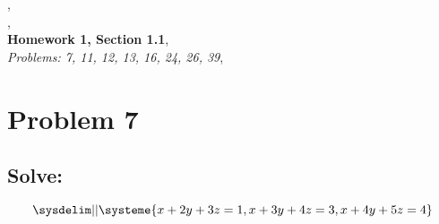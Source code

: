 \documentclass{article}
\begin{document}

\large{},\\
\large{},\\
\large\textbf{Homework 1, Section 1.1},\\
\large\textit{Problems: 7, 11, 12, 13, 16, 24, 26, 39},\\

\section*{Problem 7}
\subsection*{Solve: }
$$
\sysdelim||\systeme{
    x + 2y + 3z = 1,
    x + 3y + 4z = 3,
    x + 4y + 5z = 4
}
$$
\end{document}

